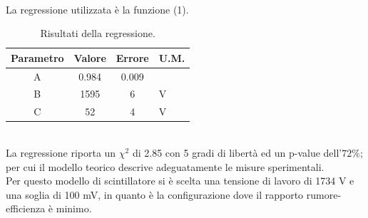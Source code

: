\documentclass[11pt]{article} %
\begin{document}
\\La regressione utilizzata è la funzione (1). 
\begin{table}[!h]
\begin{center}
\begin{tabular}{|c|c|c|l|}
\hline
\multicolumn{1}{|l|}{Parametro} & \multicolumn{1}{l|}{Valore} & \multicolumn{1}{l|}{Errore} & U.M. \\ \hline
A                               & 0.984                       & 0.009                       &      \\ \hline
B                               & 1595                        & 6                           & V    \\ \hline
C                               & 52                          & 4                           & V    \\ \hline
\end{tabular}
\end{center}
\caption{Risultati della regressione.}
\end{table}
\\La regressione riporta un $\chi ^2$ di 2.85 con 5 gradi di libertà ed un p-value dell'$72\%$; per cui il modello teorico descrive adeguatamente le misure sperimentali.
\\Per questo modello di scintillatore si è scelta una tensione di lavoro di 1734 V e una soglia di 100 mV, in quanto è la configurazione dove il rapporto rumore-efficienza è minimo.\\
\end{document}
